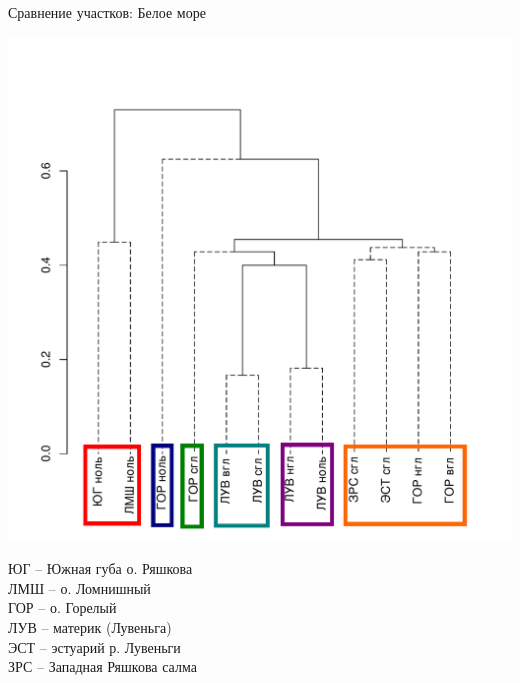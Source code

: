 \documentclass{beamer}
\begin{document}
\begin{frame}{Сравнение участков: Белое море}
	\begin{minipage}[b]{.70\linewidth}
		\includegraphics[width=\textwidth]{./White_fauna_tidal_jaccard_single_BW_1.pdf}
	\end{minipage}
\hfill
	\begin{minipage}[b]{.24\linewidth}
		\begin{tiny}
		ЮГ -- Южная губа о. Ряшкова \\
		ЛМШ -- о. Ломнишный \\
		ГОР -- о. Горелый \\
		ЛУВ -- материк (Лувеньга) \\
		ЭСТ -- эстуарий р. Лувеньги \\
		ЗРС -- Западная Ряшкова салма \\
		\end{tiny}
	\end{minipage}
\end{frame}
\end{document}
